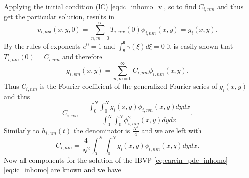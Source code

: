 \documentclass[\main/thesis.tex]{subfiles}
\begin{document}
Applying the initial condition (IC) \eqref{eq:ic_inhomo_v}, so to find $C_{i,nm}$ and thus get the particular solution, results in
\begin{equation*}
v_{i, nm}(x, y, 0) {=} \sum_{n,m{=}0}^{\infty} T_{i,nm}(0)\phi_{i,nm}(x, y) {=} g_i(x, y).
\end{equation*}
By the rules of exponents $e^0 {=} 1$ and $\int_{0}^{0} \gamma(\xi) d\xi {=} 0$ it is easily shown that \newline
$T_{i,nm}(0) {=} C_{i,nm}$ and therefore
\begin{equation*}
g_{i,nm}(x, y) {=} \sum_{n,m{=}0}^{\infty} C_{i,nm} \phi_{i,nm}(x, y).
\end{equation*}
Thus $C_{i,nm}$ is the Fourier coefficient of the generalized Fourier series of $g_i(x, y)$ and thus
\begin{equation*}
C_{i,nm} {=} \frac{\int_{0}^{N} \int_{0}^{N} g_i(x, y) \phi_{i,nm}(x, y) dy dx}{\int_{0}^{N} \int_{0}^{N} \phi_{i,nm}^2(x, y) dy dx}.
\end{equation*}
Similarly to $h_{i,nm}(t)$ the denominator is $\frac{N^2}{4}$ and we are left with
\begin{equation}
C_{i,nm} {=} \frac{4}{N^2} \int_{0}^{N} \int_{0}^{N} g_i(x, y) \phi_{i,nm}(x, y) dy dx.
\label{eq:fourier_coeff_g}
\end{equation}
Now all components for the solution of the IBVP \eqref{eq:carcin_pde_inhomo}-\eqref{eq:ic_inhomo} are known and we have
\end{document}
